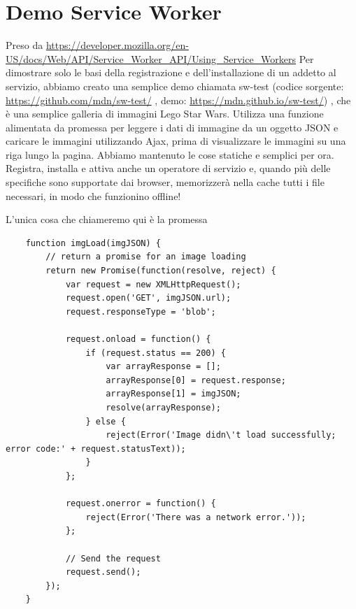 \documentclass[italian]{article}
\begin{document}
\section{Demo Service Worker}
Preso da \url{https://developer.mozilla.org/en-US/docs/Web/API/Service_Worker_API/Using_Service_Workers}
Per dimostrare solo le basi della registrazione e dell'installazione di un addetto al servizio, abbiamo creato una semplice demo chiamata sw-test (codice sorgente: \url{https://github.com/mdn/sw-test/} , demo: \url{https://mdn.github.io/sw-test/}) , che è una semplice galleria di immagini Lego Star Wars. Utilizza una funzione alimentata da promessa per leggere i dati di immagine da un oggetto JSON e caricare le immagini utilizzando Ajax, prima di visualizzare le immagini su una riga lungo la pagina. Abbiamo mantenuto le cose statiche e semplici per ora. Registra, installa e attiva anche un operatore di servizio e, quando più delle specifiche sono supportate dai browser, memorizzerà nella cache tutti i file necessari, in modo che funzionino offline!



L'unica cosa che chiameremo qui è la promessa 

\begin{lstlisting}
	function imgLoad(imgJSON) {
		// return a promise for an image loading
		return new Promise(function(resolve, reject) {
			var request = new XMLHttpRequest();
			request.open('GET', imgJSON.url);
			request.responseType = 'blob';
			
			request.onload = function() {
				if (request.status == 200) {
					var arrayResponse = [];
					arrayResponse[0] = request.response;
					arrayResponse[1] = imgJSON;
					resolve(arrayResponse);
				} else {
					reject(Error('Image didn\'t load successfully; error code:' + request.statusText));
				}
			};
			
			request.onerror = function() {
				reject(Error('There was a network error.'));
			};
			
			// Send the request
			request.send();
		});
	}
\end{lstlisting}
\end{document}
